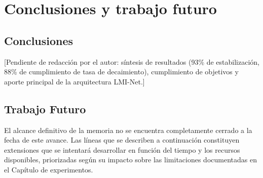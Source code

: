 \chapter{Conclusiones y trabajo futuro}
\label{sec:conclusiones}


\section{Conclusiones}
{\color{revcolor}
[Pendiente de redacción por el autor: síntesis de resultados (93\% de estabilización, 88\% de cumplimiento de tasa de decaimiento), cumplimiento de objetivos y aporte principal de la arquitectura LMI-Net.]
}

\section{Trabajo Futuro}
{\color{revcolor}
El alcance definitivo de la memoria no se encuentra completamente cerrado a la fecha de este avance. Las líneas que se describen a continuación constituyen extensiones que se intentará desarrollar en función del tiempo y los recursos disponibles, priorizadas según su impacto sobre las limitaciones documentadas en el Capítulo de experimentos.}

